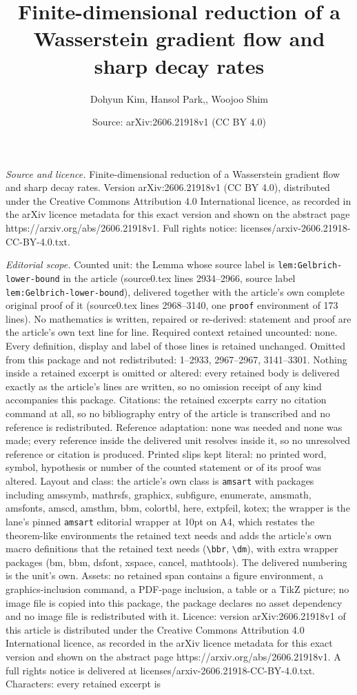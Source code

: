 \documentclass[10pt,a4paper]{amsart}
\title[Finite-dimensional reduction of a Wasserstein gradient flow ]{Finite-dimensional reduction of a Wasserstein gradient flow and sharp decay rates}
\author{Dohyun Kim, Hansol Park,, Woojoo Shim}
\date{Source: arXiv:2606.21918v1 (CC BY 4.0)}
\begin{document}
\maketitle

\noindent\emph{Source and licence.} Finite-dimensional reduction of a Wasserstein gradient flow and sharp decay rates. Version arXiv:2606.21918v1 (CC BY 4.0), distributed under the Creative Commons Attribution 4.0 International licence, as recorded in the arXiv licence metadata for this exact version and shown on the abstract page https://arxiv.org/abs/2606.21918v1. Full rights notice: licenses/arxiv-2606.21918-CC-BY-4.0.txt.\par\smallskip

\noindent\textit{Editorial scope.} Counted unit: the Lemma whose source label is \texttt{lem:Gelbrich-lower-bound} in the article (source0.tex lines 2934--2966, source label \texttt{lem:Gelbrich-lower-bound}), delivered together with the article's own complete original proof of it (source0.tex lines 2968--3140, one \texttt{proof} environment of 173 lines). No mathematics is written, repaired or re-derived: statement and proof are the article's own text line for line. Required context retained uncounted: none. Every definition, display and label of those lines is retained unchanged. Omitted from this package and not redistributed: 1--2933, 2967--2967, 3141--3301. Nothing inside a retained excerpt is omitted or altered: every retained body is delivered exactly as the article's lines are written, so no omission receipt of any kind accompanies this package. Citations: the retained excerpts carry no citation command at all, so no bibliography entry of the article is transcribed and no reference is redistributed. Reference adaptation: none was needed and none was made; every reference inside the delivered unit resolves inside it, so no unresolved reference or citation is produced. Printed slips kept literal: no printed word, symbol, hypothesis or number of the counted statement or of its proof was altered. Layout and class: the article's own class is \texttt{amsart} with packages including amssymb, mathrsfs, graphicx, subfigure, enumerate, amsmath, amsfonts, amscd, amsthm, bbm, colortbl, here, extpfeil, kotex; the wrapper is the lane's pinned \texttt{amsart} editorial wrapper at 10pt on A4, which restates the theorem-like environments the retained text needs and adds the article's own macro definitions that the retained text needs (\texttt{\textbackslash bbr}, \texttt{\textbackslash dm}), with extra wrapper packages (bm, bbm, dsfont, xspace, cancel, mathtools). The delivered numbering is the unit's own. Assets: no retained span contains a figure environment, a graphics-inclusion command, a PDF-page inclusion, a table or a TikZ picture; no image file is copied into this package, the package declares no asset dependency and no image file is redistributed with it. Licence: version arXiv:2606.21918v1 of this article is distributed under the Creative Commons Attribution 4.0 International licence, as recorded in the arXiv licence metadata for this exact version and shown on the abstract page https://arxiv.org/abs/2606.21918v1. A full rights notice is delivered at licenses/arxiv-2606.21918-CC-BY-4.0.txt. Characters: every retained excerpt is 
\end{document}

